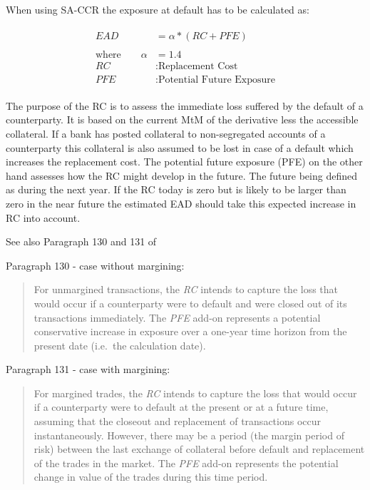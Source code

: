 \documentclass[../Thesis_AHoecherl.tex]{subfiles}
\begin{document}
When using SA-CCR the exposure at default has to be
calculated as:

\begin{align}
	\begin{split}
		EAD &= \alpha * (RC + PFE)\\
		\\
		\text{where} \qquad \alpha&=1.4 \\
		RC&: \text{Replacement Cost} \\
		PFE&: \text{Potential Future Exposure}
	\end{split}
	\label{eq:SA-CCR EAD}
\end{align}

The purpose of the RC is to assess the immediate loss suffered by the
default of a counterparty. It is based on the current MtM of the
derivative less the accessible collateral. If a bank has posted
collateral to non-segregated accounts of a counterparty this collateral
is also assumed to be lost in case of a default which increases the
replacement cost.
The potential future exposure (PFE) on the other hand assesses how the
RC might develop in the future. The future being defined as during the
next year. If the RC today is zero but is likely to be larger than zero in the
near future the estimated EAD should take this expected increase in RC
into account.

See also Paragraph 130 and 131 of \cite{SACCR}

    Paragraph 130 - case without margining:

\begin{quote}
For unmargined transactions, the \emph{RC} intends to capture the loss
that would occur if a counterparty were to default and were closed out
of its transactions immediately. The \emph{PFE} add-on represents a
potential conservative increase in exposure over a one-year time horizon
from the present date (i.e.~the calculation date).
\end{quote}

Paragraph 131 - case with margining:

\begin{quote}
For margined trades, the \emph{RC} intends to capture the loss that
would occur if a counterparty were to default at the present or at a
future time, assuming that the closeout and replacement of transactions
occur instantaneously. However, there may be a period (the margin period
of risk) between the last exchange of collateral before default and
replacement of the trades in the market. The \emph{PFE} add-on
represents the potential change in value of the trades during this time
period.
\end{quote}
\end{document}

